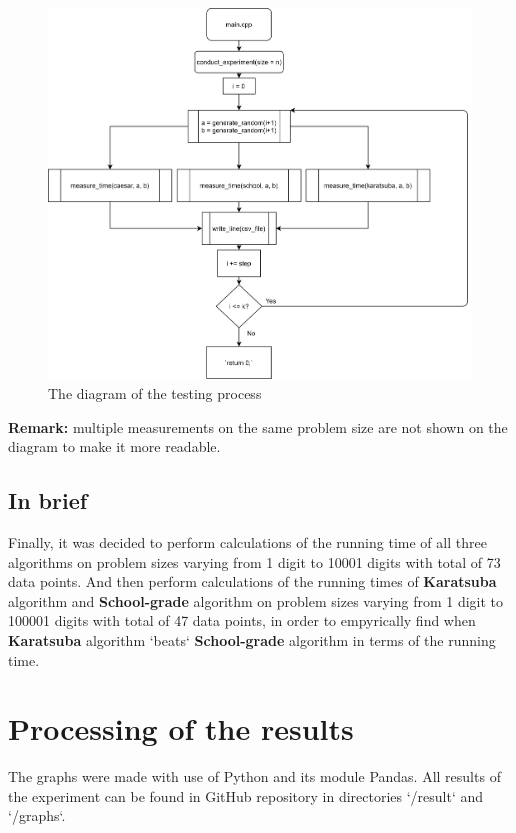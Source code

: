 \documentclass[12pt, oneside]{article}
\begin{document}
   \begin{figure}[h]
\caption{The diagram of the testing process}
\centering
\includegraphics[width=1.15\textwidth]{ExperimentFlow}
\end{figure}
\textbf{Remark:} multiple measurements on the same problem size are not shown on the diagram to make it more readable.

\subsection{In brief}
Finally, it was decided to perform calculations of the running time of all three algorithms on problem sizes varying from 1 digit to 10001 digits with total of 73 data points. And then perform calculations of the running times of \textbf{Karatsuba} algorithm and \textbf{School-grade} algorithm on problem sizes varying from 1 digit to 100001 digits with total of 47 data points, in order to empyrically find when \textbf{Karatsuba} algorithm `beats` \textbf{School-grade} algorithm in terms of the running time.

\section{Processing of the results}

The graphs were made with use of Python and its module Pandas. All results of the experiment can be found in GitHub repository in directories `/result` and `/graphs`.
\end{document}

